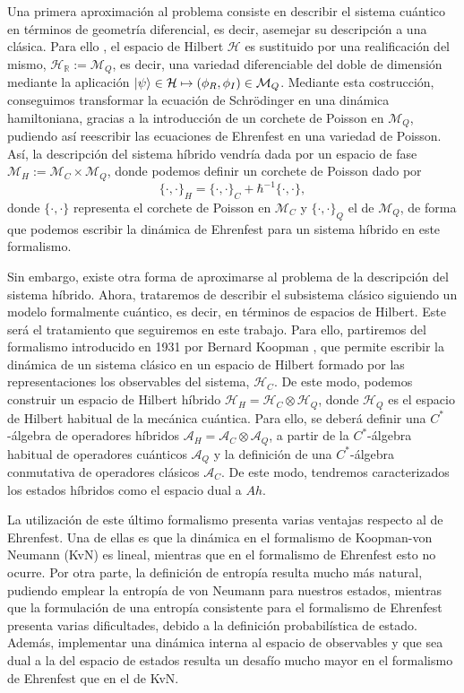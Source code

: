\documentclass[openany, 11pt]{book}
\numberwithin{equation}{chapter}
\newcommand{\Ac}{\mathcal A_C}
\newcommand{\Aq}{\mathcal A_Q}
\begin{document}
Una primera aproximación al problema consiste en describir el sistema cuántico en términos de geometría diferencial, es decir, asemejar su descripción a una clásica. Para ello \cite{GeomQM}, el espacio de Hilbert 
$\mathcal H$ es sustituido por una realificación del mismo, $\mathcal H_\mathbb{R} :=  \mathcal M_Q$, es decir, una variedad diferenciable del doble de dimensión mediante la aplicación $\ket{\psi}\in \mathcal H \mapsto (\phi_R, \phi_I)\in \mathcal M_Q$. 
Mediante esta costrucción, conseguimos transformar la ecuación de Schrödinger en una dinámica hamiltoniana, gracias a la introducción de un corchete de Poisson en $\mathcal M_Q$, pudiendo así reescribir las ecuaciones de Ehrenfest en una variedad de Poisson. 
Así, la descripción del sistema híbrido vendría dada por un espacio de fase $\mathcal M_H := \mathcal M_C\times \mathcal M_Q$, donde podemos definir un corchete de Poisson dado por \begin{equation}
    \{\cdot,\cdot\}_H = \{\cdot,\cdot\}_C+\hbar^{-1}\{\cdot,\cdot\},
\end{equation}donde $\{\cdot,\cdot\}$ representa el corchete de Poisson en $\mathcal M_C$ y $\{\cdot,\cdot\}_Q$ el de $\mathcal M_Q$, de forma que podemos escribir la dinámica de Ehrenfest para un sistema híbrido en este formalismo.

Sin embargo, existe otra forma de aproximarse al problema de la descripción del sistema híbrido. Ahora, trataremos de describir 
el subsistema clásico siguiendo un modelo formalmente cuántico, es decir, en términos de espacios de Hilbert. Este será el tratamiento que seguiremos en este trabajo. Para ello, 
partiremos del formalismo introducido en 1931 por Bernard Koopman \cite{Koopman}, que permite escribir la dinámica de un sistema clásico en un espacio de Hilbert formado por las representaciones 
los observables del sistema, $\mathcal H_C$. De este modo, podemos construir un espacio de Hilbert híbrido $\mathcal{H}_H = \mathcal H_C \otimes \mathcal H_Q$, donde $\mathcal H_Q$ es el espacio de Hilbert habitual 
de la mecánica cuántica. Para ello, se deberá definir una $C^*$-álgebra de operadores híbridos $\mathcal A_H=\Ac\otimes\Aq$, a partir de la $C^*$-álgebra habitual de operadores cuánticos $\Aq$ y la definición de una $C^*$-álgebra conmutativa de operadores 
clásicos $\Ac$. De este modo, tendremos caracterizados los estados híbridos como el espacio dual a $Ah$. 

La utilización de este último formalismo presenta varias ventajas respecto al de Ehrenfest. Una de ellas es que la dinámica en el formalismo de Koopman-von Neumann (KvN) es lineal, mientras que en el formalismo de Ehrenfest esto no ocurre.
Por otra parte, la definición de entropía resulta mucho más natural, pudiendo emplear la entropía de von Neumann para nuestros estados, mientras que la formulación de una entropía consistente para el formalismo de Ehrenfest presenta 
varias dificultades, debido a la definición probabilística de estado. Además, implementar una dinámica interna al espacio de observables y que sea dual a la del espacio de estados resulta un desafío mucho mayor en el formalismo de Ehrenfest 
que en el de KvN. 
\end{document}
